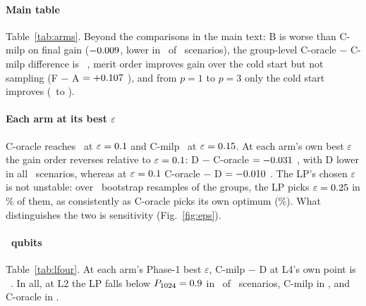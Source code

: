 \documentclass[10pt,conference]{IEEEtran}
\begin{document}
\paragraph{Main table} Table~\ref{tab:arms}. Beyond the comparisons in the main text: B is worse than C-milp on final gain ($-0.009$, lower in \GfinalBMinusCmilpL\ of \GfinalBMinusCmilpN\ scenarios), the group-level C-oracle $-$ C-milp difference is \CoracleMinusCmilpGL\ \CoracleMinusCmilpGLCI, merit order improves gain over the cold start but not sampling (F $-$ A $=+0.107$ \FMinusACI), and from $p=1$ to $p=3$ only the cold start improves (\PgndA\ to \PgndPthreeA).

\begin{table}[t]
\centering
\caption{Main table: L2 ($n=\NLtwo$), \NScen\ held-out scenarios $\times$ \NSeedsMain\ seeds, $\varepsilon=\EpsMain$. $P_{\KMax}$: probability that the best of \KMax{} samples is an exact ground state, scenario mean with 95\% $t$-interval over scenarios (columns $p{=}2,3$: means). $P_1$: single-shot probability of the ground state. $g$: final common-reference gain at $p=1$. Gap: expected repaired operating-cost gap of the best of \KMax{} samples, \%. Wrong: wrongly pinned bits of the raw warm start.}
\label{tab:arms}
\footnotesize

\end{table}

\paragraph{Each arm at its best $\varepsilon$} C-oracle reaches \PgndBestCoracle\ at $\varepsilon=0.1$ and C-milp \PgndBestCmilp\ at $\varepsilon=0.15$. At each arm's own best $\varepsilon$ the gain order reverses relative to $\varepsilon=\EpsMain$: D $-$ C-oracle $=-0.031$ \GfinalBestDMinusCoracleCI, with D lower in all \GfinalBestDMinusCoracleL\ scenarios, whereas at $\varepsilon=\EpsMain$ C-oracle $-$ D $=-0.010$ \GfinalCoracleMinusDCI. The LP's chosen $\varepsilon$ is not unstable: over \NBoot\ bootstrap resamples of the groups, the LP picks $\varepsilon=0.25$ in \BootPickD\% of them, as consistently as C-oracle picks its own optimum (\BootPickCoracle\%). What distinguishes the two is sensitivity (Fig.~\ref{fig:eps}).

\paragraph{\NLfour\ qubits} Table~\ref{tab:lfour}. At each arm's Phase-1 best $\varepsilon$, C-milp $-$ D at L4's own point is \LfourOwnCmilpMinusDBest\ \LfourOwnCmilpMinusDBestCI. In all, at L2 the LP falls below $P_{1024}=0.9$ in \NLowD\ of \NScen\ scenarios, C-milp in \NLowCmilp, and C-oracle in \NLowCoracle.
\end{document}
